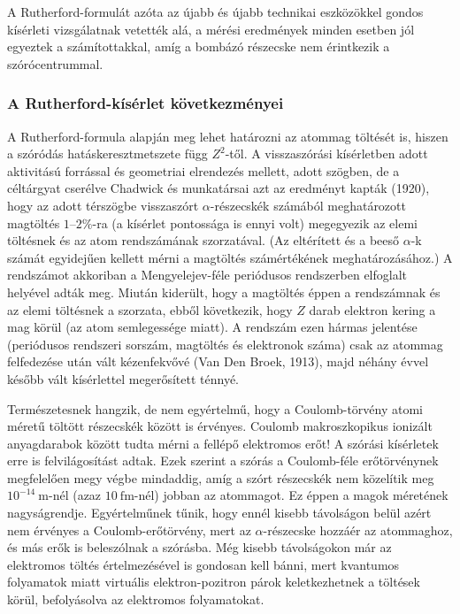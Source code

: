 \documentclass[../main.tex]{subfiles}
\begin{document}
A Rutherford-formulát azóta az újabb és újabb technikai eszközökkel
gondos kísérleti vizsgálatnak vetették alá, a mérési eredmények minden
esetben jól egyeztek a számítottakkal, amíg a bombázó részecske nem
érintkezik a szórócentrummal.

\subsubsection{A Rutherford-kísérlet következményei}
A Rutherford-formula alapján meg lehet határozni az atommag töltését is,
hiszen a szóródás hatáskeresztmetszete függ $Z^2$-től.
A visszaszórási kísérletben adott aktivitású forrással és geometriai
elrendezés mellett, adott szögben, de a céltárgyat cserélve Chadwick
és munkatársai azt az eredményt kapták (1920), hogy az adott térszögbe
visszaszórt $\alpha$-részecskék számából meghatározott magtöltés
$1$--$2\%$-ra (a kísérlet pontossága is ennyi volt) megegyezik
az elemi töltésnek és az atom rendszámának szorzatával.
(Az eltérített és a beeső $\alpha$-k számát egyidejűen kellett mérni a
magtöltés számértékének meghatározásához.)
A rendszámot akkoriban a Mengyelejev-féle periódusos rendszerben elfoglalt
helyével adták meg.
Miután kiderült, hogy a magtöltés éppen a rendszámnak és az elemi
töltésnek a szorzata, ebből következik, hogy $Z$ darab elektron kering
a mag körül (az atom semlegessége miatt).
A rendszám ezen hármas jelentése (periódusos rendszeri sorszám,
magtöltés és elektronok száma) csak az atommag felfedezése után vált
kézenfekvővé (Van Den Broek, 1913), majd néhány évvel később vált
kísérlettel megerősített ténnyé.

Természetesnek hangzik, de nem egyértelmű, hogy a Coulomb-törvény atomi
méretű töltött részecskék között is érvényes.
Coulomb makroszkopikus ionizált anyagdarabok között tudta mérni a
fellépő elektromos erőt!
A szórási kísérletek erre is felvilágosítást adtak.
Ezek szerint a szórás a Coulomb-féle erőtörvénynek megfelelően megy végbe
mindaddig, amíg a szórt részecskék nem közelítik meg
$10^{-14}\ \mathrm{m}$-nél (azaz $10\ \mathrm{fm}$-nél) jobban az atommagot.
Ez éppen a magok méretének nagyságrendje.
Egyértelműnek tűnik, hogy ennél kisebb távolságon belül azért nem
érvényes a Coulomb-erőtörvény, mert az $\alpha$-részecske hozzáér az
atommaghoz, és más erők is beleszólnak a szórásba.
Még kisebb távolságokon már az elektromos töltés értelmezésével is
gondosan kell bánni, mert kvantumos folyamatok miatt virtuális
elektron-pozitron párok keletkezhetnek a töltések körül, befolyásolva
az elektromos folyamatokat.
\end{document}
